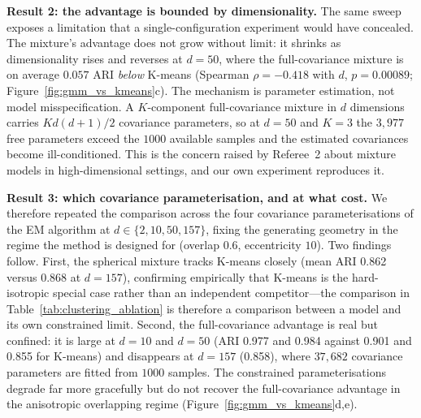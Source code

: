 \documentclass[lettersize,journal]{IEEEtran}
\begin{document}
		\noindent \textbf{Result 2: the advantage is bounded by dimensionality.} The same sweep exposes a limitation that a single-configuration experiment would have concealed. The mixture's advantage does not grow without limit: it shrinks as dimensionality rises and reverses at $d = 50$, where the full-covariance mixture is on average $0.057$ ARI \emph{below} K-means (Spearman $\rho = -0.418$ with $d$, $p = 0.00089$; Figure~\ref{fig:gmm_vs_kmeans}c). The mechanism is parameter estimation, not model misspecification. A $K$-component full-covariance mixture in $d$ dimensions carries $Kd(d+1)/2$ covariance parameters, so at $d = 50$ and $K = 3$ the $3{,}977$ free parameters exceed the $1000$ available samples and the estimated covariances become ill-conditioned. This is the concern raised by Referee~2 about mixture models in high-dimensional settings, and our own experiment reproduces it.
		
		\noindent \textbf{Result 3: which covariance parameterisation, and at what cost.} We therefore repeated the comparison across the four covariance parameterisations of the EM algorithm at $d \in \{2, 10, 50, 157\}$, fixing the generating geometry in the regime the method is designed for (overlap $0.6$, eccentricity $10$). Two findings follow. First, the spherical mixture tracks K-means closely (mean ARI 0.862 versus 0.868 at $d=157$), confirming empirically that K-means is the hard-isotropic special case rather than an independent competitor---the comparison in Table~\ref{tab:clustering_ablation} is therefore a comparison between a model and its own constrained limit. Second, the full-covariance advantage is real but confined: it is large at $d = 10$ and $d = 50$ (ARI 0.977 and 0.984 against 0.901 and 0.855 for K-means) and disappears at $d = 157$ (0.858), where $37{,}682$ covariance parameters are fitted from $1000$ samples. The constrained parameterisations degrade far more gracefully but do not recover the full-covariance advantage in the anisotropic overlapping regime (Figure~\ref{fig:gmm_vs_kmeans}d,e).
		
\end{document}
